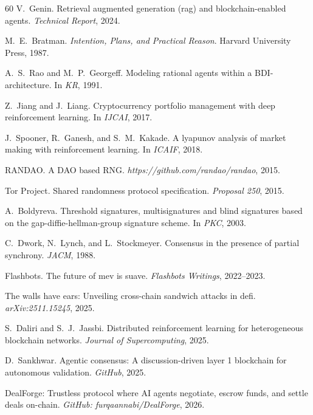 \documentclass[11pt]{article}
\begin{document}
\begin{thebibliography}{60}
V.~Genin.
\newblock Retrieval augmented generation (rag) and blockchain-enabled agents.
\newblock \textit{Technical Report}, 2024.

M.~E.~Bratman.
\newblock \textit{Intention, Plans, and Practical Reason}.
\newblock Harvard University Press, 1987.

A.~S.~Rao and M.~P.~Georgeff.
\newblock Modeling rational agents within a BDI-architecture.
\newblock In \textit{KR}, 1991.

Z.~Jiang and J.~Liang.
\newblock Cryptocurrency portfolio management with deep reinforcement learning.
\newblock In \textit{IJCAI}, 2017.

J.~Spooner, R.~Ganesh, and S.~M.~Kakade.
\newblock A lyapunov analysis of market making with reinforcement learning.
\newblock In \textit{ICAIF}, 2018.

RANDAO.
\newblock A DAO based RNG.
\newblock \textit{https://github.com/randao/randao}, 2015.

Tor Project.
\newblock Shared randomness protocol specification.
\newblock \textit{Proposal 250}, 2015.

A.~Boldyreva.
\newblock Threshold signatures, multisignatures and blind signatures based on the gap-diffie-hellman-group signature scheme.
\newblock In \textit{PKC}, 2003.

C.~Dwork, N.~Lynch, and L.~Stockmeyer.
\newblock Consensus in the presence of partial synchrony.
\newblock \textit{JACM}, 1988.

Flashbots.
\newblock The future of mev is suave.
\newblock \textit{Flashbots Writings}, 2022--2023.

The walls have ears: Unveiling cross-chain sandwich attacks in defi.
\newblock \textit{arXiv:2511.15245}, 2025.

S.~Daliri and S.~J.~Jassbi.
\newblock Distributed reinforcement learning for heterogeneous blockchain networks.
\newblock \textit{Journal of Supercomputing}, 2025.

D.~Sankhwar.
\newblock Agentic consensus: A discussion-driven layer 1 blockchain for autonomous validation.
\newblock \textit{GitHub}, 2025.

DealForge: Trustless protocol where AI agents negotiate, escrow funds, and settle deals on-chain.
\newblock \textit{GitHub: furqaannabi/DealForge}, 2026.

\end{thebibliography}
\end{document}
